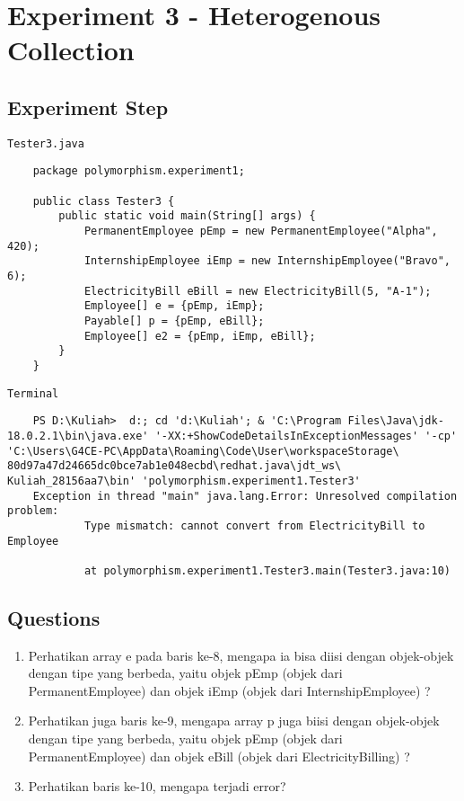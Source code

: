 \documentclass[12pt,titlepage]{article}
\begin{document}
\newpage
\section{Experiment 3 - Heterogenous Collection}
\subsection{Experiment Step}
\texttt{Tester3.java}
\begin{verbatim}
    package polymorphism.experiment1;

    public class Tester3 {
        public static void main(String[] args) {
            PermanentEmployee pEmp = new PermanentEmployee("Alpha", 420);
            InternshipEmployee iEmp = new InternshipEmployee("Bravo", 6);
            ElectricityBill eBill = new ElectricityBill(5, "A-1");
            Employee[] e = {pEmp, iEmp};
            Payable[] p = {pEmp, eBill};
            Employee[] e2 = {pEmp, iEmp, eBill};
        }
    }
\end{verbatim}

\texttt{Terminal}
\begin{verbatim}
    PS D:\Kuliah>  d:; cd 'd:\Kuliah'; & 'C:\Program Files\Java\jdk-18.0.2.1\bin\java.exe' '-XX:+ShowCodeDetailsInExceptionMessages' '-cp' 'C:\Users\G4CE-PC\AppData\Roaming\Code\User\workspaceStorage\ 80d97a47d24665dc0bce7ab1e048ecbd\redhat.java\jdt_ws\ Kuliah_28156aa7\bin' 'polymorphism.experiment1.Tester3'
    Exception in thread "main" java.lang.Error: Unresolved compilation problem: 
            Type mismatch: cannot convert from ElectricityBill to Employee      
    
            at polymorphism.experiment1.Tester3.main(Tester3.java:10)
\end{verbatim}
\subsection{Questions}
\begin{enumerate}
    \item Perhatikan array e pada baris ke-8, mengapa ia bisa diisi dengan objek-objek dengan tipe yang berbeda, yaitu objek pEmp (objek dari PermanentEmployee) dan objek iEmp (objek dari InternshipEmployee) ?
    \item Perhatikan juga baris ke-9, mengapa array p juga biisi dengan objek-objek dengan tipe yang berbeda, yaitu objek pEmp (objek dari PermanentEmployee) dan objek eBill (objek dari ElectricityBilling) ?
    \item Perhatikan baris ke-10, mengapa terjadi error?
\end{enumerate}
\end{document}
